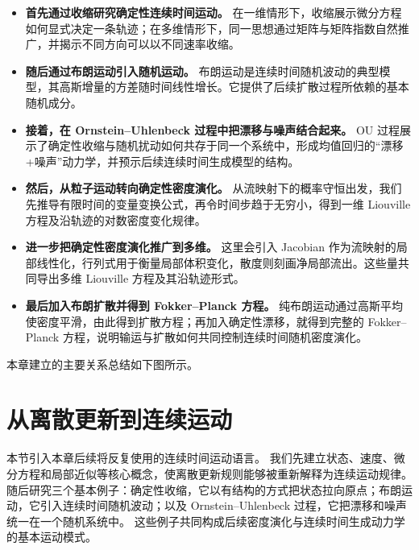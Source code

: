\begin{itemize}
    \item[\(\rightarrow\)] \textbf{首先通过收缩研究确定性连续时间运动。}
    在一维情形下，收缩展示微分方程如何显式决定一条轨迹；在多维情形下，同一思想通过矩阵与矩阵指数自然推广，并揭示不同方向可以以不同速率收缩。

    \item[\(\rightarrow\)] \textbf{随后通过布朗运动引入随机运动。}
    布朗运动是连续时间随机波动的典型模型，其高斯增量的方差随时间线性增长。它提供了后续扩散过程所依赖的基本随机成分。

    \item[\(\rightarrow\)] \textbf{接着，在 Ornstein--Uhlenbeck 过程中把漂移与噪声结合起来。}
    OU 过程展示了确定性收缩与随机扰动如何共存于同一个系统中，形成均值回归的“漂移+噪声”动力学，并预示后续连续时间生成模型的结构。

    \item[\(\rightarrow\)] \textbf{然后，从粒子运动转向确定性密度演化。}
    从流映射下的概率守恒出发，我们先推导有限时间的变量变换公式，再令时间步趋于无穷小，得到一维 Liouville 方程及沿轨迹的对数密度变化规律。

    \item[\(\rightarrow\)] \textbf{进一步把确定性密度演化推广到多维。}
    这里会引入 Jacobian 作为流映射的局部线性化，行列式用于衡量局部体积变化，散度则刻画净局部流出。这些量共同导出多维 Liouville 方程及其沿轨迹形式。

    \item[\(\rightarrow\)] \textbf{最后加入布朗扩散并得到 Fokker--Planck 方程。}
    纯布朗运动通过高斯平均使密度平滑，由此得到扩散方程；再加入确定性漂移，就得到完整的 Fokker--Planck 方程，说明输运与扩散如何共同控制连续时间随机密度演化。
\end{itemize}

\medskip
\noindent 本章建立的主要关系总结如下图所示。

\medskip

\section{从离散更新到连续运动}

本节引入本章后续将反复使用的连续时间运动语言。
我们先建立状态、速度、微分方程和局部近似等核心概念，使离散更新规则能够被重新解释为连续运动规律。
随后研究三个基本例子：确定性收缩，它以有结构的方式把状态拉向原点；布朗运动，它引入连续时间随机波动；以及 Ornstein--Uhlenbeck 过程，它把漂移和噪声统一在一个随机系统中。
这些例子共同构成后续密度演化与连续时间生成动力学的基本运动模式。

